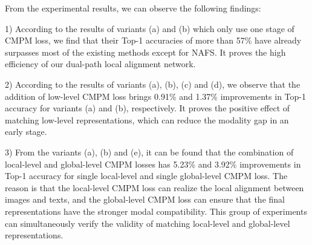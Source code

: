 \documentclass[review]{elsarticle}
\begin{document}
\begin{table}[!t]
\caption{Comparable results of combinations of CMPM loss in different stages. Top-1, Top-5 and Top-10 accuracies (\%) are reported.} 
\centering
\label{tab2}
\end{table}

From the experimental results, we can observe the following findings: 

1)	According to the results of variants (a) and (b) which only use one stage of CMPM loss, we find that their Top-1 accuracies of more than 57\% have already surpasses most of the existing methods except for NAFS. It proves the high efficiency of our dual-path local alignment network.

2)	According to the results of variants (a), (b), (c) and (d), we observe that the addition of low-level CMPM loss brings 0.91\% and 1.37\% improvements in Top-1 accuracy for variants (a) and (b), respectively. It proves the positive effect of matching low-level representations, which can reduce the modality gap in an early stage.

3)	From the variants (a), (b) and (e), it can be found that the combination of local-level and global-level CMPM losses has 5.23\% and 3.92\% improvements in Top-1 accuracy for single local-level and single global-level CMPM loss. The reason is that the local-level CMPM loss can realize the local alignment between images and texts, and the global-level CMPM loss can ensure that the final representations have the stronger modal compatibility. This group of experiments can simultaneously verify the validity of matching local-level and global-level representations.
\end{document}
